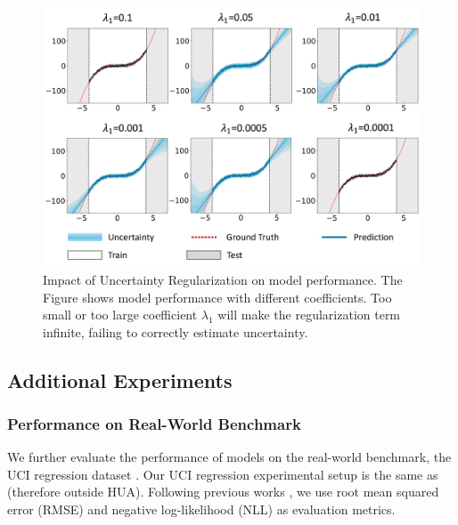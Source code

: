 \begin{figure}
\centering
\includegraphics[width=0.9\columnwidth]{sensitivity_outside_HUA.png} 
\caption{Impact of Uncertainty Regularization on model performance. The Figure shows model performance with different coefficients. 
Too small or too large coefficient $\lambda_{1}$ will make the regularization term infinite, failing to correctly estimate uncertainty.}
\label{sensitivity_outside_HUA_appen}
\end{figure}

\subsection{Additional Experiments}
\label{appendix_22}
\subsubsection{Performance on Real-World Benchmark}
We further evaluate the performance of models on the real-world benchmark, the UCI regression dataset \cite{hernandez2015probabilistic}. Our UCI regression experimental setup is the same as \citeauthor{hernandez2015probabilistic} (therefore outside HUA). Following previous works \cite{NEURIPS2020_aab08546,oh2022improving}, we use root mean squared error (RMSE) and negative log-likelihood (NLL) as evaluation metrics.


